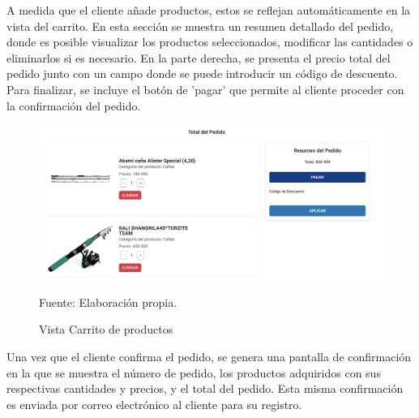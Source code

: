 A medida que el cliente añade productos, estos se reflejan automáticamente en la vista del carrito. En esta sección se muestra un resumen detallado del pedido, donde es posible visualizar los productos seleccionados, modificar las cantidades o eliminarlos si es necesario. En la parte derecha, se presenta el precio total del pedido junto con un campo donde se puede introducir un código de descuento. Para finalizar, se incluye el botón de 'pagar' que permite al cliente proceder con la confirmación del pedido.


\begin{figure}[H]
\begin{center}
\includegraphics[scale=0.38]{./Images/vistaCarrito.png}
\caption{Vista Carrito de productos} Fuente: Elaboración propia.

\label{fig:fig1}

\end{center}
\end{figure}

Una vez que el cliente confirma el pedido, se genera una pantalla de confirmación en la que se muestra el número de pedido, los productos adquiridos con sus respectivas cantidades y precios, y el total del pedido. Esta misma confirmación es enviada por correo electrónico al cliente para su registro.

